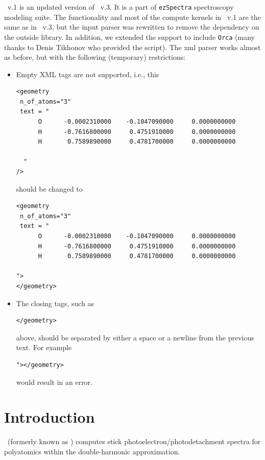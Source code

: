 \documentclass[11pt]{article}
\begin{document}
\ezFCF\ v.1 is an updated version of \ezS\ v.3. It is a part of \texttt{ezSpectra} spectroscopy
modeling suite.  The functionality 
and most of the compute kernels in \ezFCF\ v.1
are the same as in \ezS\ v.3, 
but the input parser was rewritten to remove the dependency on the outside library. In addition, we extended
the support to include {\tt Orca} (many thanks to Denis Tikhonov who provided the script). 
The xml parser  works almost as before, but with the following (temporary) restrictions:
  \begin{itemize}
  \item Empty XML tags are not supported, i.e., this
    \renewcommand{\baselinestretch}{1.0}
\begin{verbatim}
<geometry
 n_of_atoms="3"
 text = "
      O      -0.0002310000    -0.1047090000     0.0000000000
      H      -0.7616800000     0.4751910000     0.0000000000
      H       0.7589890000     0.4781700000     0.0000000000

  "
/>
\end{verbatim}
should be changed to
\begin{verbatim}
<geometry
 n_of_atoms="3"
 text = "
      O      -0.0002310000    -0.1047090000     0.0000000000
      H      -0.7616800000     0.4751910000     0.0000000000
      H       0.7589890000     0.4781700000     0.0000000000

">
</geometry>
\end{verbatim}
\renewcommand{\baselinestretch}{1.5}
\item The closing tags, such as \begin{verbatim}</geometry>\end{verbatim} above, should be separated by either a space or a newline from the previous text. For example  \begin{verbatim}"></geometry>\end{verbatim} would result in an error.
  \end{itemize}    

  
\section*{Introduction}

\ezFCF\ (formerly known as \ezS) computes stick photoelectron/photodetachment spectra for polyatomics 
within the double-harmonic approximation. 
\end{document}
